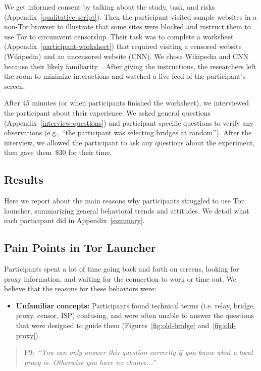 \documentclass[USenglish,oneside,twocolumn]{article}
\newcommand{\pquote}[2]{
\begin{quotation}
\noindent #1:~\textit{#2}
\end{quotation}
}
\begin{document}
We get informed consent by talking about the study, task, and risks (Appendix~\ref{qualitative-script}). Then the participant visited sample websites in a non-Tor browser to illustrate that some sites were blocked and instruct them to use Tor to circumvent censorship. Their task was to complete a worksheet (Appendix~\ref{participant-worksheet}) that required visiting a censored website (Wikipedia) and an uncensored website (CNN). We chose Wikipedia and CNN because their likely familiarity~\cite{alexa}. After giving the instructions, the researchers left the room to minimize interactions and watched a live feed of the participant's screen.

After 45 minutes (or when participants finished the worksheet), we interviewed the participant about their experience. We asked general questions (Appendix~\ref{interview-questions}) and participant-specific questions to verify any observations (e.g., ``the participant was selecting bridges at random''). After the interview, we allowed the participant to ask any questions about the experiment, then gave them~\$30 for their time. 

\subsection{Results} 

Here we report about the main reasons why participants struggled to use Tor launcher, summarizing general behavioral trends and attitudes. We detail what each participant did in Appendix~\ref{summary}. 

\subsection{Pain Points in Tor Launcher} 
\label{sec:pain-points}
Participants spent a lot of time going back and forth on screens, looking for proxy information, and waiting for the connection to work or time out. We believe that the reasons for these behaviors were:\\

\begin{itemize}
\item {\bfseries Unfamiliar concepts:} Participants found technical terms (i.e. relay, bridge, proxy, censor, ISP) confusing, and were often unable to answer the questions that were designed to guide them (Figures~\ref{fig:old-bridge} and~\ref{fig:old-proxy}).
\end{itemize} 

\pquote{P9}{``You can only answer this question correctly if you know what a local proxy is.
Otherwise you have no chance...''}
\end{document}
